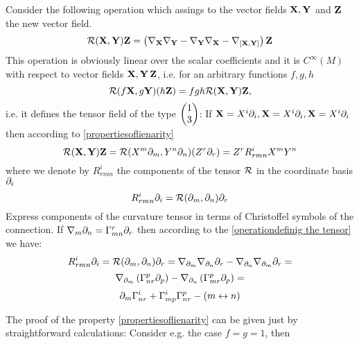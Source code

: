 \documentclass[12pt]{article}
\theoremstyle{theorem}
\numberwithin{equation}{section}
\begin{document}
{Consider the following operation which assings to the vector fields ${\bf X},{\bf Y}$ and ${\bf Z}$ the new vector field.
\begin{equation}\label{operationdefinig the tensor}
   {\cal R}({\bf X},{\bf Y}){\bf Z}=
    \left(
    \nabla_{\bf X}\nabla_{\bf Y}-\nabla_{\bf Y}\nabla_{\bf X}-
   \nabla_{[{\bf X},{\bf Y}]}
    \right){\bf Z}
\end{equation}
This operation is obviously linear over the scalar coefficients and it is $C^{\infty}(M)$
with respect to vector fields ${\bf X},{\bf Y}\,{\bf Z}$, i.e. for an arbitrary functions
$f,g,h$
        \begin{equation}\label{propertiesoflienarity}
            {\cal R}(f{\bf X},g{\bf Y})(h{\bf Z})=fgh{\cal R}({\bf X},{\bf Y}){\bf Z},
        \end{equation}
        i.e. it defines
the tensor field of the type $\begin{pmatrix}1\cr 3\end{pmatrix}$: If ${\bf X}=X^i\partial_i, {\bf X}=X^i\partial_i,{\bf X}=X^i\partial_i$
then according to \eqref{propertiesoflienarity}
           $$
        {\cal R}({\bf X},{\bf Y}){\bf Z}={\cal R}(X^m\partial_m,Y^n\partial_n)(Z^r\partial_r)=Z^rR^i_{rmn}X^mY^n
           $$
where we denote by $R^i_{rmn}$ the components of the tensor $\cal R$ in the coordinate basis ${\partial_i}$
\begin{equation}\label{componentsofcurvaturetensor}
    R^i_{rmn}\partial_i={\cal R}(\partial_m,\partial_n)\partial_r
\end{equation}
Express components of the curvature tensor in terms of Christoffel symbols of the connection.
If $\nabla_m\partial_n=\Gamma_{mn}^r\partial_r$ then according to the \eqref{operationdefinig the tensor} we have:
                $$
        R^i_{rmn}\partial_i={\cal R}(\partial_m,\partial_n)\partial_r=\nabla_{\partial_m}\nabla_{\partial_n}\partial_r-\nabla_{\partial_n}\nabla_{\partial_m}\partial_r=
                    $$
                    $$
              \nabla_{\partial_m}\left(\Gamma_{nr}^p\partial_p\right)-\nabla_{\partial_n}\left(\Gamma_{mr}^p\partial_p\right)=
                $$
                \begin{equation}\label{curvatureincomponents}
                \partial_m\Gamma_{nr}^i+\Gamma_{mp}^i\Gamma_{nr}^p-\left(m\leftrightarrow n\right)
                \end{equation}

 The proof of the property \eqref{propertiesoflienarity} can be given just  by straightforward calculations:
     Consider e.g. the case $f=g=1$, then

}
\end{document}

